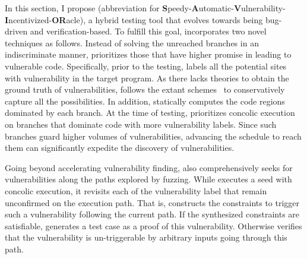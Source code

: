 In this section, I propose \savior (abbreviation for {\bf
S}peedy-{\bf A}utomatic-{\bf V}ulnerability-{\bf I}ncentivized-{\bf OR}acle),
a hybrid testing tool that evolves towards being bug-driven and verification-based. To fulfill 
this goal, \savior incorporates two novel techniques as follows. 
 Instead of solving the unreached branches 
in an indiscriminate manner, \savior prioritizes those that have higher 
promise in leading to vulnerable code. Specifically, prior to the testing, 
\savior labels all the potential sites with vulnerability in the target program. As 
there lacks theories to obtain the ground truth of vulnerabilities, \savior follows 
the extant schemes~\cite{ubsanlist, Dietz:2012} to conservatively capture all the possibilities. 
In addition, \savior statically computes the code regions dominated by each branch. 
At the time of testing, \savior prioritizes concolic execution on branches that dominate 
code with more vulnerability labels. Since such branches guard higher volumes 
of vulnerabilities, advancing the schedule to reach them can significantly 
expedite the discovery of vulnerabilities. 

Going beyond accelerating vulnerability finding, \savior also comprehensively seeks 
for vulnerabilities along the paths explored by fuzzing. 
While \savior executes a seed with concolic execution, it revisits each 
of the vulnerability label that remain unconfirmed on the execution path.
That is, \savior constructs the constraints to trigger such a vulnerability following the current path. 
If the synthesized constraints are satisfiable, \savior generates a test 
case as a proof of this vulnerability. Otherwise \savior verifies that the vulnerability 
is un-triggerable by arbitrary inputs going through this path. 

